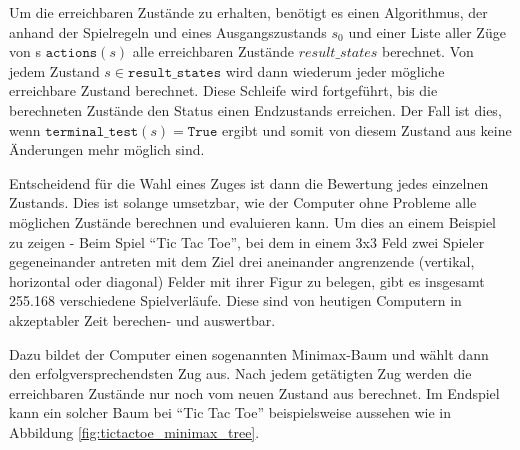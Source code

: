 Um die erreichbaren Zustände zu erhalten, benötigt es einen Algorithmus, der anhand der Spielregeln und eines Ausgangszustands $s_0$ und einer Liste aller Züge von s $\mathtt{actions}(s)$ alle erreichbaren Zustände $result\_states$ berechnet. Von jedem Zustand $s \in \mathtt{result\_states}$ wird dann wiederum jeder mögliche erreichbare Zustand berechnet. Diese Schleife wird fortgeführt, bis die berechneten Zustände den Status einen Endzustands erreichen. Der Fall ist dies, wenn $\mathtt{terminal\_test}(s) = \mathtt{True}$ ergibt und somit von diesem Zustand aus keine Änderungen mehr möglich sind.

Entscheidend für die Wahl eines Zuges ist dann die Bewertung jedes einzelnen Zustands. Dies ist solange umsetzbar, wie der Computer ohne Probleme alle möglichen Zustände berechnen und evaluieren kann. Um dies an einem Beispiel zu zeigen - Beim Spiel ``Tic Tac Toe'', bei dem in einem 3x3 Feld zwei Spieler gegeneinander antreten mit dem Ziel drei aneinander angrenzende (vertikal, horizontal oder diagonal) Felder mit ihrer Figur zu belegen, gibt es insgesamt 255.168 verschiedene Spielverläufe. \cite{Kaplan2017} Diese sind von heutigen Computern in akzeptabler Zeit berechen- und auswertbar.


Dazu bildet der Computer einen sogenannten Minimax-Baum und wählt dann den erfolgversprechendsten Zug aus. Nach jedem getätigten Zug werden die erreichbaren Zustände nur noch vom neuen Zustand aus berechnet. Im Endspiel kann ein solcher Baum bei ``Tic Tac Toe'' beispielsweise aussehen wie in Abbildung \ref{fig:tictactoe_minimax_tree}.

